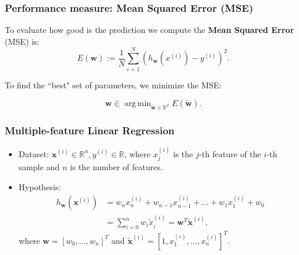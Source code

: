 \documentclass{beamer}
\DeclareMathOperator*{\argmin}{arg\,min}
\begin{document}
	\begin{frame}
		\frametitle{Performance measure: Mean Squared Error (MSE)}
		To evaluate how good is the prediction we compute the \textbf{Mean Squared Error} (MSE) is:
		$$E({\bm{w}}) := \frac{1}{N} \sum_{i=1}^{N} (h_{\bm{w}}(x^{(i)}) - y^{(i)})^2.$$
		
		To find the ``best" set of parameters, we minimize the MSE:
		
		$$\bm{w} \in \argmin_{\tilde{\bm{w}} \in \mathbb{R}^2} E(\tilde{\bm{w}}).$$
		
	\end{frame}


	\begin{frame}
		\frametitle{Multiple-feature Linear Regression}
		
		\begin{itemize}
			\item Dataset: $\bm{x}^{(i)} \in \mathbb{R}^n, y^{(i)} \in \mathbb{R}$, where
			$x^{(i)}_j$ is the $j$-th feature of the $i$-th sample and $n$ is the number of features.
			\item Hypothesis: 
			\begin{align*}
				h_{\bm{w}}(\bm{x}^{(i)}) &= w_{n}x^{(i)}_n + w_{n-1}x^{(i)}_{n-1} + \dots + w_1 x^{(i)}_1 + w_0\\
				&= \sum_{i=0}^n w_i \tilde{x}^{(i)}_i = \bm{w}^T \tilde{\bm{x}}^{(i)},
			\end{align*}
			where $\bm{w} = [w_0, \dots, w_n]^T$ and $\tilde{\bm{x}}^{(i)} = [1, x^{(i)}_1, \dots, x^{(i)}_n]^T$.
		\end{itemize}
		
	\end{frame}
\end{document}
